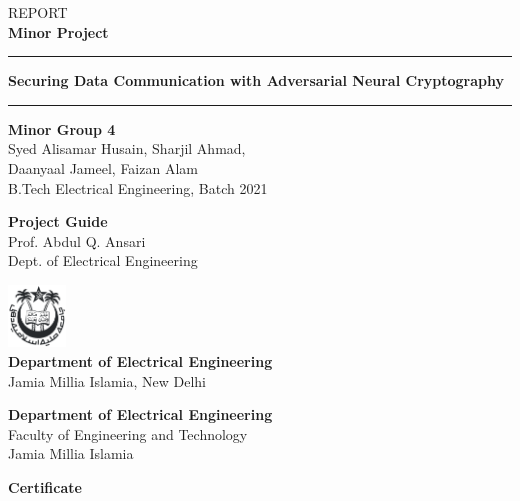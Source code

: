 \documentclass[a4paper]{article}
\begin{document}
  \begin{titlepage}
    \vspace*{\fill}
    \begin{center}
      {\large REPORT}\\[0.1in]
      {\bfseries{\Huge Minor Project}}
      \vspace{0.5in}
      \par\noindent\rule{\textwidth}{0.5pt}

      \vspace{0.25in}
      {\bfseries {\LARGE Securing Data Communication with Adversarial Neural Cryptography}}\\
      \vspace{0.2in}
      \par\noindent\rule{\textwidth}{0.5pt}
      \vspace{2in}

      {\bfseries Minor Group 4}\\
      {\large Syed Alisamar Husain, Sharjil Ahmad,\\ Daanyaal Jameel, Faizan Alam\\}
      B.Tech Electrical Engineering, Batch 2021\\
      \vspace{0.5in}

      {\bfseries Project Guide}\\
      {\large Prof. Abdul Q. Ansari\\}
      Dept. of Electrical Engineering
      \vspace{1in}

      \includegraphics[height=0.65in]{../ref/JMI.png}\\
      {\bfseries Department of Electrical Engineering} \\
      Jamia Millia Islamia, New Delhi
      \thispagestyle{empty}
    \end{center}
    \vspace*{\fill}
  \end{titlepage}

  \newpage
  \begin{center}
    {\Large \bfseries Department of Electrical Engineering}\\
    {\large Faculty of Engineering and Technology}\\
    {\large Jamia Millia Islamia}
  \end{center}
  \vspace*{1in}
  \begin{center}
    {\LARGE \bfseries Certificate}
    \vspace*{0.125in}
  \end{center}
\end{document}
